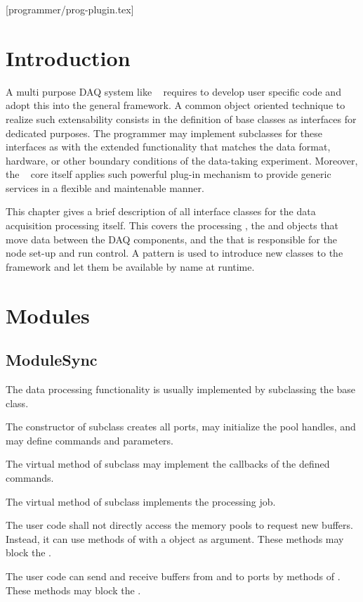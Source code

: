 [programmer/prog-plugin.tex]
\section{Introduction}
A multi purpose DAQ system like \dabc~ requires to develop user specific code and adopt
this into the general framework. A common object oriented technique to realize such
extensability consists in the definition of base classes as interfaces for dedicated purposes.
The programmer may implement subclasses for these interfaces as 
with the extended functionality that matches the data format, hardware, or other boundary conditions of the
data-taking experiment. Moreover, the  \dabc~ core itself applies such powerful plug-in mechanism to provide generic services in a flexible and maintenable manner.   

This chapter gives a brief description of all interface classes for the data acquisition 
processing itself. This covers the processing , the  and 
 objects that move data between the DAQ components, 
and the  that is responsible for the node set-up and run control.
A  pattern is used to introduce new classes to the framework and let them
be available by name at runtime.

\section{Modules}
\subsection{ModuleSync}
The data processing functionality is usually implemented by subclassing 
   the  base class. 
\bcir
\item  The constructor of  subclass  creates all 
      ports, may initialize the pool handles, and may 
      define commands and parameters. 
\item  The virtual  method of  
      subclass may implement the callbacks of the defined commands.
\item  The virtual  method of  
      subclass implements the processing job.
\item  The user code shall not directly access the 
      memory pools to request new buffers. Instead, it can use methods of 
       with a  object as argument. 
      These methods may block the .
\item  The user code can send and receive buffers 
      from and to ports by methods of . 
      These methods may block the .
\ecir
